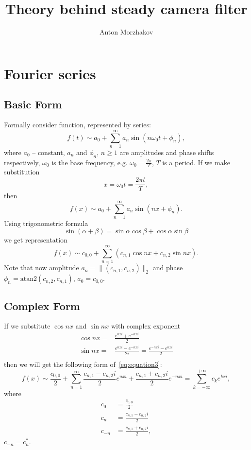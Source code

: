 \documentclass[9pt]{article}
\numberwithin{equation}{section}
\begin{document}
\title{\sc Theory behind steady camera filter}
\author{Anton Morzhakov}
\maketitle

\section{Fourier series}\label{sec:theory-behind-fourier-series}
\subsection{Basic Form}\label{subsec:basic-form}
Formally consider function, represented by series:
\begin{equation}\label{eq:equation}
    f(t) \sim a_0 + \sum_{n=1}^{\infty} a_n \sin (n \omega_0 t + \phi_n),
\end{equation}
where $a_0$ -- constant, $a_n$ and $\phi_n$, $n \geq 1$ are amplitudes and phase shifts respectively,
$\omega_0$ is the base frequency, e.g. $\omega_0 = \frac{2\pi}{T}$, $T$  is a period.
If we make substitution
\[
    x = \omega_0 t  = \frac{2\pi t}{T},
\]
then
\begin{equation}\label{eq:equation2}
    f(x) \sim a_0 + \sum_{n=1}^{\infty} a_n \sin (n x + \phi_n).
\end{equation}
Using trigonometric formula
\[
    \sin (\alpha +  \beta)  = \sin \alpha \cos \beta + \cos \alpha \sin \beta
\]
we get representation
\begin{equation}\label{eq:equation3}
    f(x) \sim c_{0, 0} + \sum_{n=1}^{\infty} \left( c_{n, 1} \cos nx + c_{n, 2} \sin nx \right).
\end{equation}
Note that now amplitude $a_n = \|(c_{n, 1}, c_{n, 2})\|_2$ and phase $\phi_n = \mathrm{atan2} (c_{n, 2}, c_{n, 1})$,
$a_0 = c_{0, 0}$.

\subsection{Complex Form}\label{subsec:complex-form}

If we substitute $\cos nx$ and $\sin nx$ with complex exponent
\begin{align*}
    \cos nx = & \frac{e^{nxi} + e^{-nxi}}{2}   \\
    \sin nx = & \frac{e^{nxi} - e^{-nxi}}{2i} = \frac{e^{-nxi} - e^{nxi}}{2} \\
\end{align*}
then we will get the following form of~\ref{eq:equation3}:
\begin{equation}\label{eq:equation4}
    f(x) \sim \frac{c_{0,0}}{2} + \sum_{n=1}^{\infty} \frac{c_{n, 1} - c_{n, 2}i}{2} e^{nxi} +
    \frac{c_{n, 1} + c_{n, 2}i}{2} e^{-nxi} = \allowbreak  \sum_{k=-\infty}^{+\infty} c_k e^{kxi},
\end{equation}
where
\begin{align}
    c_0 & = \frac{c_{0, 0}}{2} \\
    c_n &= \frac{c_{n,1} - c_{n,2}i}{2} \\
    c_{-n} &= \frac{c_{n,1} + c_{n,2}i}{2},
\end{align}
$c_{-n} = c_n^{\ast}$.
\end{document}
